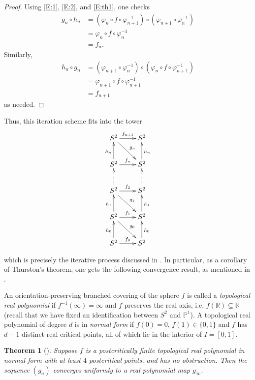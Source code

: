 \documentclass[11pt]{amsart}
\newtheorem{theorem}{Theorem}[section]
\begin{document}
\begin{proof}
Using \eqref{E:1}, \eqref{E:2}, and \eqref{E:th1}, one checks
\begin{align*}
g_n \circ h_n & = (\varphi_n \circ f \circ \varphi_{n+1}^{-1})  \circ  (\varphi_{n+1} \circ \varphi_n^{-1}) \\
 & = \varphi_n \circ f \circ \varphi_{n}^{-1} \\
 & = f_{n}.
\end{align*}
Similarly, 
\begin{align*}
h_n \circ g_n & = (\varphi_{n+1} \circ \varphi_n^{-1}) \circ (\varphi_n \circ f \circ \varphi_{n+1}^{-1}) \\
 & = \varphi_{n+1} \circ f \circ \varphi_{n+1}^{-1} \\
 & = f_{n+1}
\end{align*}
as needed.
\end{proof}

Thus, this iteration scheme fits into the tower
$$\xymatrix{
S^2 \ar[r]^{f_{n+1}}  \ar[dr]^{g_n} & S^2  \\
S^2 \ar[r]^{f_n} \ar[u]^{h_n}   & S^2 \ar[u]_{h_n}  \\
S^2 \ar[r]^{f_2}  \ar[dr]^{g_1} \ar@{..>}[u] & S^2 \ar@{..>}[u] \\
S^2 \ar[r]^{f_1}  \ar[dr]^{g_0} \ar[u]^{h_1} & S^2  \ar[u]_{h_1}\\
S^2 \ar[r]^{f_0} \ar[u]^{h_0} & S^2 \ar[u]_{h_0} 
}$$

which is precisely the iterative process discussed in \cite{Mil}. 
In particular, as a corollary of Thurston's theorem, one gets the following convergence result, 
as mentioned in \cite{Mil-slides}.

An orientation-preserving branched covering of the sphere $f$ is called a \emph{topological real polynomial} 
if $f^{-1}(\infty) = \infty$ and $f$ preserves the real axis, i.e. $f(\mathbb{R}) \subseteq \mathbb{R}$ (recall that we have fixed an identification between $S^2$ and $\mathbb{P}^1$). 
A topological real polynomial of degree $d$ is in \emph{normal form} if $f(0) = 0$, $f(1) \in \{0, 1\}$ and $f$ has $d-1$ distinct real critical points, all of which lie in the interior of $I = [0, 1]$.

\begin{theorem}[\cite{Mil-slides}]
Suppose $f$ is a postcritically finite topological real polynomial in normal form with at least $4$ postcritical points, and has no obstruction. Then the sequence $(g_n)$ converges uniformly to a real polynomial map $g_\infty$.
\end{theorem}
\end{document}
